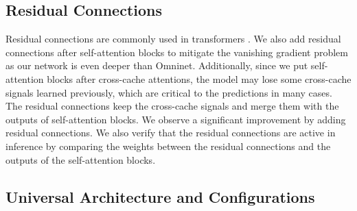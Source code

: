 \documentclass{article}
\begin{document}
\subsection{Residual Connections}

Residual connections are commonly used in transformers \cite{vaswani2017attention,dosovitskiy2020image}. We also add residual connections after self-attention blocks to mitigate the vanishing gradient problem as our network is even deeper than Omninet. Additionally, since we put self-attention blocks after cross-cache attentions, the model may lose some cross-cache signals learned previously, which are critical to the predictions in many cases. The residual connections keep the cross-cache signals and merge them with the outputs of self-attention blocks. We observe a significant improvement by adding residual connections. We also verify that the residual connections are active in inference by comparing the weights between the residual connections and the outputs of the self-attention blocks.



\subsection{Universal Architecture and Configurations}
\end{document}
